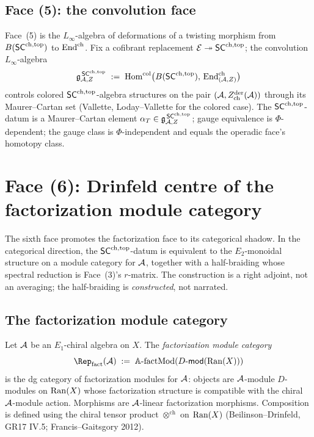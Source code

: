 \subsection{Face (5): the convolution face}\label{subsec:face-convolution}

Face~(5) is the $L_\infty$-algebra of deformations of a twisting
morphism from $B(\mathsf{SC}^{\mathrm{ch},\mathrm{top}})$ to $\mathrm{End}^{\mathrm{ch}}$. Fix a cofibrant
replacement $\mathcal{E}\twoheadrightarrow\mathsf{SC}^{\mathrm{ch},\mathrm{top}}$; the convolution
$L_\infty$-algebra
\begin{equation}
 \mathfrak{g}^{\,\mathsf{SC}^{\mathrm{ch},\mathrm{top}}}_{\mathcal{A},Z}
 \;:=\;
 \mathrm{Hom}^{\mathrm{col}}\bigl(B(\mathsf{SC}^{\mathrm{ch},\mathrm{top}}),\,\mathrm{End}^{\mathrm{ch}}_{(\mathcal{A},Z)}\bigr)
\end{equation}
controls colored $\mathsf{SC}^{\mathrm{ch},\mathrm{top}}$-algebra structures on the pair
$(\mathcal{A},Z^{\mathrm{der}}_{\mathrm{ch}}(\mathcal{A}))$ through its Maurer--Cartan set
(Vallette, Loday--Vallette for the colored case). The
$\mathsf{SC}^{\mathrm{ch},\mathrm{top}}$-datum is a Maurer--Cartan element $\alpha_T\in
\mathfrak{g}^{\,\mathsf{SC}^{\mathrm{ch},\mathrm{top}}}_{\mathcal{A},Z}$; gauge equivalence is $\Phi$-dependent;
the gauge class is $\Phi$-independent and equals the operadic
face's homotopy class.

\section{Face (6): Drinfeld centre of the factorization module category}
\label{sec:face-drinfeld-centre}

The sixth face promotes the factorization face to its categorical
shadow. In the categorical direction, the $\mathsf{SC}^{\mathrm{ch},\mathrm{top}}$-datum is
equivalent to the $E_2$-monoidal structure on a module category for
$\mathcal{A}$, together with a half-braiding whose spectral reduction is
Face~(3)'s $r$-matrix. The construction is a right adjoint, not an
averaging; the half-braiding is
\emph{constructed}, not narrated.

\subsection{The factorization module category}\label{subsec:fact-mod-cat}

\begin{definition}\label{def:rep-fact}%
%
Let $\mathcal{A}$ be an $E_1$-chiral algebra on $X$. The \emph{factorization
module category}
\begin{equation}
 \Rep_{\mathrm{fact}}(\cA)
 \;:=\;
 \mathbb{A}\text{-}\mathrm{fact}\mathrm{Mod}(\Dmod(\Ran(X)))
\end{equation}
is the dg category of factorization modules for $\mathcal{A}$: objects are
$\mathcal{A}$-module $D$-modules on $\mathrm{Ran}(X)$ whose factorization structure
is compatible with the chiral $\mathcal{A}$-module action. Morphisms are
$\mathcal{A}$-linear factorization morphisms. Composition is defined
using the chiral tensor product
$\otimes^{\mathrm{ch}}$ on $\mathrm{Ran}(X)$
(Beilinson--Drinfeld, GR17 IV.5; Francis--Gaitsgory 2012).
\end{definition}

